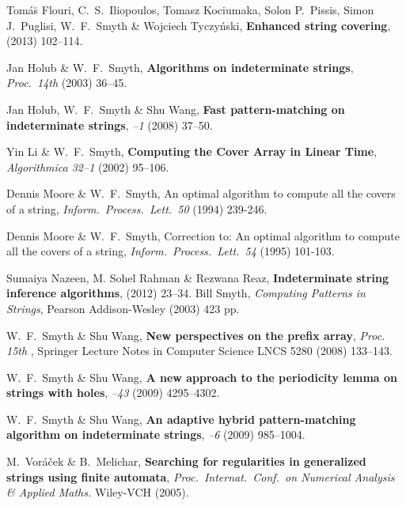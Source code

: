 \documentclass[runningheads,a4paper]{llncs}
\begin{document}
\begin{thebibliography}{99}
 Tom\'{a}\u{s} Flouri, C.\ S.\ Iliopoulos, Tomasz Kociumaka,
Solon P.\ Pissis, Simon J.\ Puglisi, W.\ F.\ Smyth \& Wojciech Tyczy\'{n}ski,
{\bf Enhanced string covering},
{\it {}} (2013) 102--114.

 Jan Holub \& W.\ F.\ Smyth,
{\bf Algorithms on indeterminate strings},
{\it Proc.\ 14th \AWOCA} (2003) 36--45.

 Jan Holub, W.\ F.\ Smyth \& Shu Wang,
{\bf Fast pattern-matching on indeterminate strings},
{\it {}--1} (2008) 37--50.


 Yin Li \& W.\ F.\ Smyth,
{\bf Computing the Cover Array in Linear Time},
{\it Algorithmica 32--1} (2002) 95--106.

 Dennis
Moore \& W.\ F.\ Smyth, An optimal algorithm to compute all the
covers of a string, {\it Inform.\ Process.\ Lett.\ 50} (1994) 239-246.

 Dennis
Moore \& W.\ F.\ Smyth, Correction to: An optimal algorithm to
compute all the covers of a string, {\it Inform.\ Process.\ Lett.\ 54} (1995) 101-103.

	Sumaiya Nazeen, M. Sohel Rahman \& Rezwana Reaz, {\bf Indeterminate string inference algorithms}, 
{\it {}} (2012) 23--34.
 Bill Smyth,
{\it Computing Patterns in Strings},
Pearson Addison-Wesley (2003) 423 pp.

 W.\ F.\ Smyth \& Shu Wang,
{\bf New perspectives on the prefix array}, 
{\em Proc. 15th \SPIRE},
Springer Lecture Notes in Computer Science LNCS 5280 (2008) 133--143.

 W.\ F.\ Smyth \& Shu Wang,
{\bf A new approach to the periodicity lemma on strings with holes},
{\it {}--43} (2009) 4295--4302.

 W.\ F.\ Smyth \& Shu Wang,
{\bf An adaptive hybrid pattern-matching algorithm on indeterminate strings},
{\it {}--6} (2009) 985--1004.

 M.\ Vor\'{a}\v{c}ek \& B.\ Melichar,
{\bf Searching for regularities in generalized strings using finite automata},
{\it Proc.\ Internat.\ Conf.\ on Numerical Analysis \& Applied Maths.} Wiley-VCH (2005).
\end{thebibliography}
\end{document}
